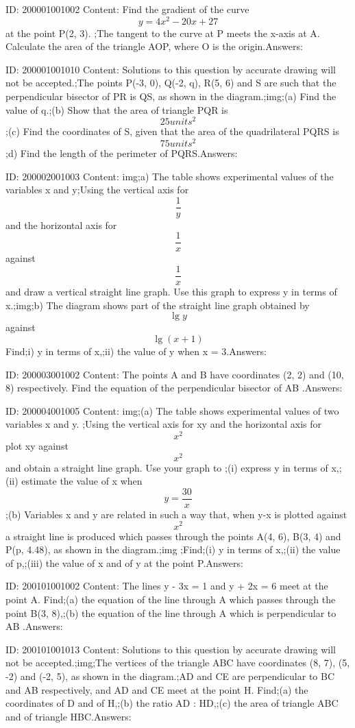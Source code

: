 \documentclass{article}
\begin{document}
ID: 200001001002
Content:
Find the gradient of the curve \[y=4x^2-20x+27\] at the point P(2, 3). ;The tangent to the curve at P meets the x-axis at A. Calculate the area of the triangle AOP, where O is the origin.Answers:

ID: 200001001010
Content:
Solutions to this question by accurate drawing will not be accepted.;The points P(-3, 0), Q(-2, q), R(5, 6) and S are such that the perpendicular bisector of PR is QS, as shown in the diagram.;img;(a)	Find the value of q.;(b) Show that the area of triangle PQR is \[25units^2\];(c)	Find the coordinates of S, given that the area of the quadrilateral PQRS is \[75units^2\];d)	Find the length of the perimeter of PQRS.Answers:

ID: 200002001003
Content:
img;a) The table shows experimental values of the variables x and y;Using the vertical axis for \[\frac{1}{y}\] and the horizontal axis for \[\frac{1}{x}\]against \[\frac{1}{x}\] and draw a vertical straight line graph. Use this graph to express y in terms of x.;img;b) The diagram shows part of the straight line graph obtained by \[\lg y\] against \[\lg(x + 1)\] Find;i) y in terms of x,;ii) the value of y when x = 3.Answers:

ID: 200003001002
Content:
The points A and B have coordinates (2, 2) and (10, 8) respectively. Find the equation of the perpendicular bisector of AB .Answers:

ID: 200004001005
Content:
img;(a) The table shows experimental values of two variables x and y. ;Using the vertical axis for xy and the horizontal axis for \[x^2\] plot xy against \[x^2\] and obtain a straight line graph. Use your graph to ;(i)	express y in terms of x,;(ii)	estimate the value of x when \[y=\frac{30}{x}\];(b)	Variables x and y are related in such a way that, when y-x is plotted against \[x^2\] a straight line is produced which passes through the points A(4, 6), B(3, 4) and P(p, 4.48), as shown in the diagram.;img ;Find;(i)	y in terms of x,;(ii)	the value of p,;(iii)	the value of x and of y at the point P.Answers:

ID: 200101001002
Content:
The lines y - 3x = 1 and  y + 2x = 6 meet at the point A. Find;(a)	the equation of the line through A which passes through the point B(3, 8),;(b)	the equation of the line through A which is perpendicular to AB .Answers:

ID: 200101001013
Content:
Solutions to this question by accurate drawing will not be accepted.;img;The vertices of the triangle ABC have coordinates (8, 7), (5, -2) and (-2, 5), as shown in the diagram.;AD and CE are perpendicular to BC and AB respectively, and AD and CE meet at the point H. Find;(a) the coordinates of D and of H,;(b)  the ratio AD : HD,;(c) the area of triangle ABC and of triangle HBC.Answers:
\end{document}
